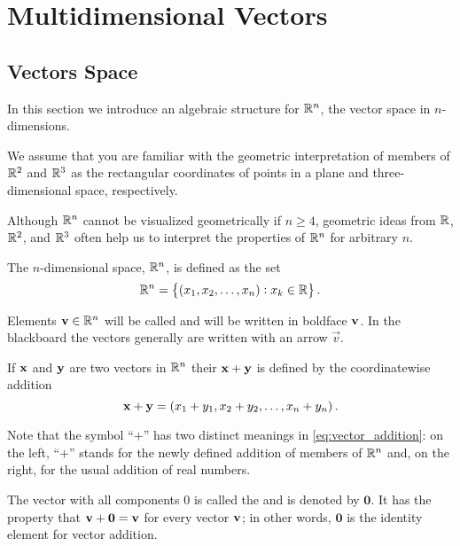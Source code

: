 \chapter{Multidimensional Vectors}
\section{Vectors Space}

In this section we
introduce an algebraic structure for $\mathbb{R}^n$,  the vector space in $n$-dimensions. 

We assume that you are familiar with the geometric
interpretation of members of $\mathbb{R}^2$ and $\mathbb{R}^3$ as the
rectangular coordinates of
points in a plane and three-dimensional space, respectively. 

Although $\mathbb{R}^n$ cannot be visualized geometrically if $n\ge4$, geometric
ideas from $\mathbb{R}$, $\mathbb{R}^2$, and $\mathbb{R}^3$ often help us to
interpret the properties of $\mathbb{R}^n$ for arbitrary $n$.

\begin{df}
The $n$-dimensional space, $\mathbb{R}^n$, is defined as the set
$$ \mathbb{R}^n = \left\{ \left(x_1, x_2, \dots , x_n\right): x_k \in \mathbb{R}\right\}. $$
\end{df}

Elements $\mathbf{ v} \in \mathbb{R}^n$ will be called  and will be written in boldface  $\mathbf{ v} $. In the blackboard the
vectors generally are written with an arrow $\vec{v}$.

\begin{df}
If $\mathbf{ x}$ and $\mathbf{ y}$ are two vectors in $\mathbb{R}^n$ their
 $\mathbf{ x} + \mathbf{ y}$ is defined by the
coordinatewise addition
\begin{equation}\mathbf{ x} + \mathbf{ y} = \left(x_1 + y_1, x_2 + y_2,  \dots, x_n + y_n \right).    \label{eq:vector_addition}\end{equation}
\end{df}


Note that the symbol ``$+$'' has two distinct meanings in \eqref{eq:vector_addition}: on the
left, ``$+$'' stands for the newly defined addition of members of
$\mathbb{R}^n$ and, on the right, for the usual addition of real numbers.


The vector with all components $0$ is called the  and is denoted by $\mathbf{0}$. It has
the property that $\mathbf{ v} + \mathbf{0} = \mathbf{ v}$ for every vector $\mathbf{ v}$; in other words, $\mathbf{0}$ is the identity element
for vector addition. 

